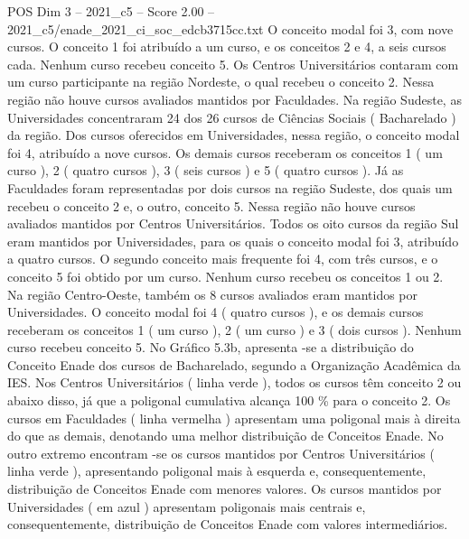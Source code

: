 \begin{textsample}{POS Dim 3 – 2021\_c5 – Score 2.00 – 2021\_c5/enade\_2021\_ci\_soc\_edcb3715cc.txt}
O conceito modal foi 3, com nove cursos.
O conceito 1 foi atribuído a um curso, e os conceitos 2 e 4, a seis cursos cada.
Nenhum curso recebeu conceito 5.
Os Centros Universitários contaram com um curso participante na região Nordeste, o qual recebeu o conceito 2.
Nessa região não houve cursos avaliados mantidos por Faculdades.
Na região Sudeste, as Universidades concentraram 24 dos 26 cursos de Ciências Sociais ( Bacharelado ) da região.
Dos cursos oferecidos em Universidades, nessa região, o conceito modal foi 4, atribuído a nove cursos.
Os demais cursos receberam os conceitos 1 ( um curso ), 2 ( quatro cursos ), 3 ( seis cursos ) e 5 ( quatro cursos ).
Já as Faculdades foram representadas por dois cursos na região Sudeste, dos quais um recebeu o conceito 2 e, o outro, conceito 5.
Nessa região não houve cursos avaliados mantidos por Centros Universitários.
Todos os oito cursos da região Sul eram mantidos por Universidades, para os quais o conceito modal foi 3, atribuído a quatro cursos.
O segundo conceito mais frequente foi 4, com três cursos, e o conceito 5 foi obtido por um curso.
Nenhum curso recebeu os conceitos 1 ou 2.
Na região Centro-Oeste, também os 8 cursos avaliados eram mantidos por Universidades.
O conceito modal foi 4 ( quatro cursos ), e os demais cursos receberam os conceitos 1 ( um curso ), 2 ( um curso ) e 3 ( dois cursos ).
Nenhum curso recebeu conceito 5.
No Gráfico 5.3b, apresenta -se a distribuição do Conceito Enade dos cursos de Bacharelado, segundo a Organização Acadêmica da IES.
Nos Centros Universitários ( linha verde ), todos os cursos têm conceito 2 ou abaixo disso, já que a poligonal cumulativa alcança 100 \% para o conceito 2.
Os cursos em Faculdades ( linha vermelha ) apresentam uma poligonal mais à direita do que as demais, denotando uma melhor distribuição de Conceitos Enade.
No outro extremo encontram -se os cursos mantidos por Centros Universitários ( linha verde ), apresentando poligonal mais à esquerda e, consequentemente, distribuição de Conceitos Enade com menores valores.
Os cursos mantidos por Universidades ( em azul ) apresentam poligonais mais centrais e, consequentemente, distribuição de Conceitos Enade com valores intermediários.

\end{textsample}

